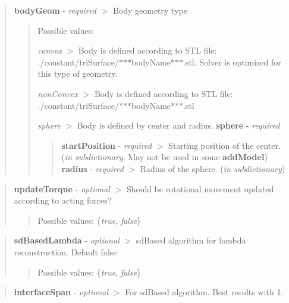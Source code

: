 \begin{quote}
{\bfseries{body\+Geom}} -\/ {\itshape required} $>$ Body geometry type \begin{quote}
Possible values\+:
\begin{DoxyItemize}
\item {\itshape convex} $>$ Body is defined according to S\+TL file\+: ./constant/tri\+Surface/$\ast$$\ast$$\ast$body\+Name$\ast$$\ast$$\ast$.stl. Solver is optimized for this type of geometry.
\item {\itshape non\+Convex} $>$ Body is defined according to S\+TL file\+: ./constant/tri\+Surface/$\ast$$\ast$$\ast$body\+Name$\ast$$\ast$$\ast$.stl
\item {\itshape sphere} $>$ Body is defined by center and radius. {\bfseries{sphere}} -\/ {\itshape required} ~\newline
 \begin{quote}
{\bfseries{start\+Position}} -\/ {\itshape required} $>$ Starting position of the center. ({\itshape in subdictionary}. May not be used in some {\bfseries{add\+Model}}) ~\newline
 {\bfseries{radius}} -\/ {\itshape required} $>$ Radius of the sphere. ({\itshape in subdictionary}) \end{quote}

\end{DoxyItemize}\end{quote}
\end{quote}


\begin{quote}
{\bfseries{update\+Torque}} -\/ {\itshape optional} $>$ Should be rotational movement updated according to acting forces? \begin{quote}
Possible values\+: \{{\itshape true}, {\itshape false}\} \end{quote}
\end{quote}


\begin{quote}
{\bfseries{sd\+Based\+Lambda}} -\/ {\itshape optional} $>$ sd\+Based algorithm for lambda reconstruction. Default false \begin{quote}
Possible values\+: \{{\itshape true}, {\itshape false}\} ~\newline
 \end{quote}
\end{quote}


\begin{quote}
{\bfseries{interface\+Span}} -\/ {\itshape optional} $>$ For sd\+Based algorithm. Best results with 1. \end{quote}


